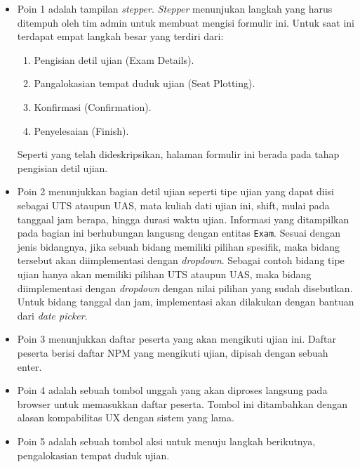     \begin{itemize}
        \item Poin 1 adalah tampilan \textit{stepper}. \textit{Stepper} menunjukan langkah yang harus ditempuh oleh
            tim admin untuk membuat mengisi formulir ini. Untuk saat ini terdapat empat langkah besar yang terdiri
            dari:
                \begin{enumerate}
                    \item Pengisian detil ujian (Exam Details).
                    \item Pangalokasian tempat duduk ujian (Seat Plotting).
                    \item Konfirmasi (Confirmation).
                    \item Penyelesaian (Finish).
                \end{enumerate}
            Seperti yang telah dideskripsikan, halaman formulir ini berada pada tahap pengisian detil ujian.
            
        \item Poin 2 menunjukkan bagian detil ujian seperti tipe ujian yang dapat diisi sebagai UTS ataupun UAS,
            mata kuliah dati ujian ini, shift, mulai pada tanggaal jam berapa, hingga durasi waktu ujian.
            Informasi yang ditampilkan pada bagian ini berhubungan langusng dengan entitas \texttt{Exam}. Sesuai dengan
            jenis bidangnya, jika sebuah bidang memiliki pilihan spesifik, maka bidang tersebut akan diimplementasi
            dengan \textit{dropdown}. Sebagai contoh bidang tipe ujian hanya akan memiliki pilihan UTS ataupun UAS,
            maka bidang diimplementasi dengan \textit{dropdown} dengan nilai pilihan yang sudah disebutkan.
            Untuk bidang tanggal dan jam, implementasi akan dilakukan dengan bantuan dari \textit{date picker}.
            
        \item Poin 3 menunjukkan daftar peserta yang akan mengikuti ujian ini. Daftar peserta berisi daftar NPM
            yang mengikuti ujian, dipisah dengan sebuah enter.
            
        \item Poin 4 adalah sebuah tombol unggah yang akan diproses langsung pada browser untuk memasukkan daftar
            peserta. Tombol ini ditambahkan dengan alasan kompabilitas UX dengan sistem yang lama.
            
        \item Poin 5 adalah sebuah tombol aksi untuk menuju langkah berikutnya, pengalokasian tempat duduk ujian.
        
    \end{itemize}
    
